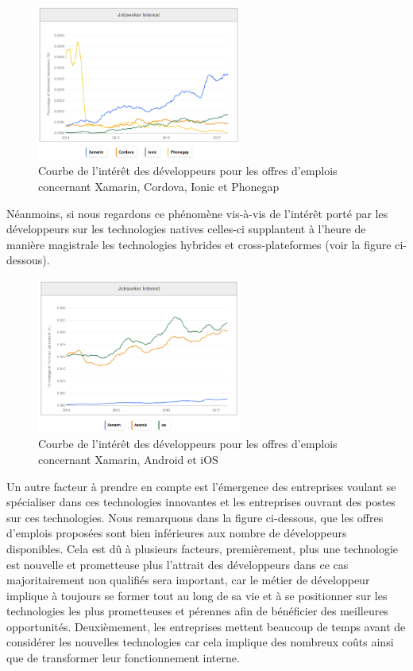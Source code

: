 \documentclass[11]{article}
\begin{document}
  \begin{figure}[h]
    \centering
    \includegraphics[width=0.6\textwidth]{f1}
    \caption{Courbe de l'intérêt des développeurs pour les offres d'emplois concernant Xamarin, Cordova, Ionic et Phonegap}
    \label{bat}
\end{figure}

 Néanmoins, si nous regardons ce phénomène vis-à-vis de l’intérêt porté par les développeurs sur les technologies natives celles-ci supplantent à l’heure de manière magistrale les technologies hybrides et cross-plateformes (voir la figure ci-dessous).
 
   \begin{figure}[h]
    \centering
    \includegraphics[width=0.6\textwidth]{f2}
    \caption{Courbe de l'intérêt des développeurs pour les offres d'emplois concernant Xamarin, Android et iOS}
    \label{bat}
\end{figure}

Un autre facteur à prendre en compte est l’émergence des entreprises voulant se spécialiser dans ces technologies innovantes et les entreprises ouvrant des postes sur ces technologies. Nous remarquons dans la figure ci-dessous, que les offres d’emplois proposées sont bien inférieures aux nombre de développeurs disponibles. Cela est dû à plusieurs facteurs, premièrement, plus une technologie est nouvelle et prometteuse plus l’attrait des développeurs dans ce cas majoritairement non qualifiés sera important, car le métier de développeur implique à toujours se former tout au long de sa vie et à se positionner sur les technologies les plus prometteuses et pérennes afin de bénéficier des meilleures opportunités. Deuxièmement, les entreprises mettent beaucoup de temps avant de considérer les nouvelles technologies car cela implique des nombreux coûts ainsi que de transformer leur fonctionnement interne.
\end{document}
